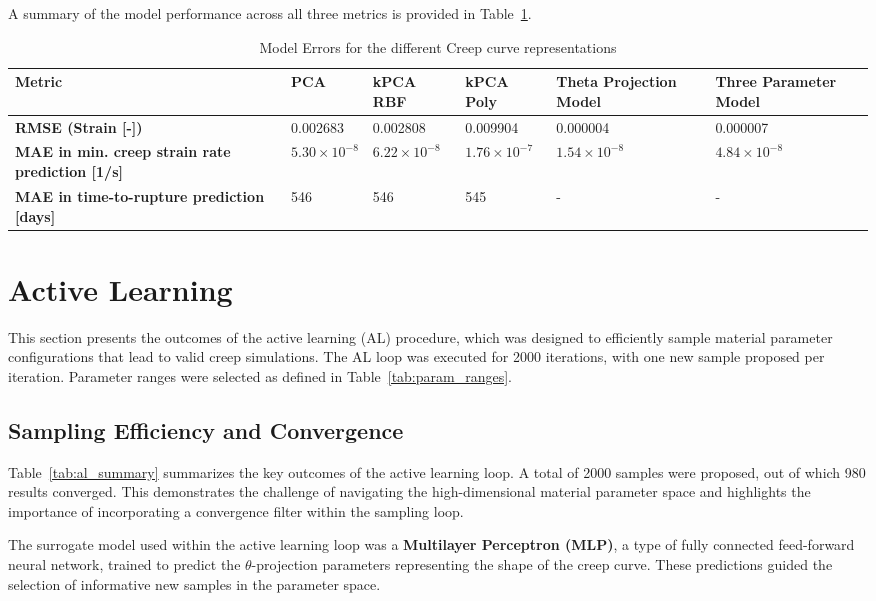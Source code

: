 \documentclass[class=scrbook, crop=false]{standalone}
\begin{document}
	A summary of the model performance across all three metrics is provided in Table~\ref{tab:model_errors}.
		
	\begin{table}[H]
		\centering
		\caption{Model Errors for the different Creep curve representations}
		\begin{tabularx}{\textwidth}{|X|X|X|X|X|X|}
			\hline
			\textbf{Metric} & \textbf{PCA} & \textbf{kPCA RBF} & \textbf{kPCA Poly} & \textbf{Theta Projection Model} & \textbf{Three Parameter Model} \\
			\hline
			\textbf{RMSE (Strain [-])} & 0.002683 & 0.002808 & 0.009904 & 0.000004 & 0.000007 \\
			\hline
			\textbf{MAE in min. creep strain rate prediction [1/s]} & $5.30 \times 10^{-8}$ & $6.22 \times 10^{-8}$ & $1.76 \times 10^{-7}$ & $1.54 \times 10^{-8}$ & $4.84 \times 10^{-8}$ \\
			\hline
			\textbf{MAE in time-to-rupture prediction [days]} & 546 & 546 & 545 & - & - \\
			\hline
		\end{tabularx}
		\label{tab:model_errors}
	\end{table}
	
	\section{Active Learning}
	\label{Section::Results_AL}
	
	This section presents the outcomes of the active learning (AL) procedure, which was designed to efficiently sample material parameter configurations that lead to valid creep simulations. The AL loop was executed for 2000 iterations, with one new sample proposed per iteration. Parameter ranges were selected as defined in Table~\ref{tab:param_ranges}.
	
	\subsection{Sampling Efficiency and Convergence}	
	
	Table~\ref{tab:al_summary} summarizes the key outcomes of the active learning loop. A total of 2000 samples were proposed, out of which 980 results converged. This demonstrates the challenge of navigating the high-dimensional material parameter space and highlights the importance of incorporating a convergence filter within the sampling loop.
	
	The surrogate model used within the active learning loop was a \textbf{Multilayer Perceptron (MLP)}, a type of fully connected feed-forward neural network, trained to predict the $\theta$-projection parameters representing the shape of the creep curve. These predictions guided the selection of informative new samples in the parameter space.
	
\end{document}
